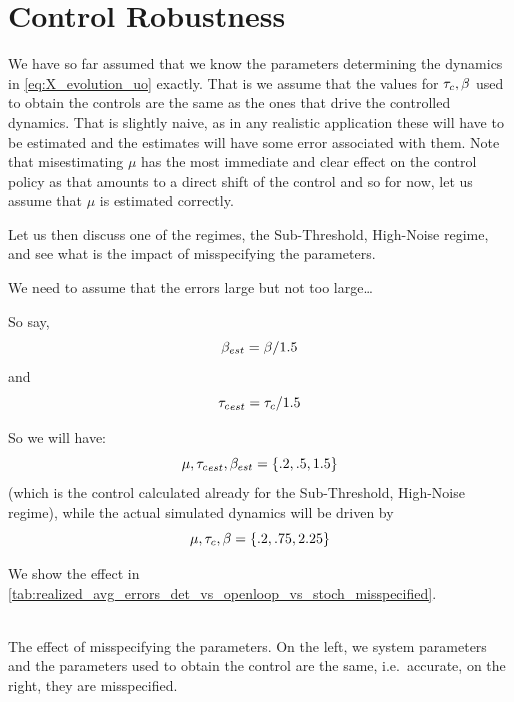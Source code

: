 \documentclass{article}
\begin{document}
\clearpage 

\section{Control Robustness}
We have so far assumed that we know the parameters determining the dynamics in
\cref{eq:X_evolution_uo} exactly. That is we assume that the values for ${ \tau_{c} },
{\beta}$ used to obtain the controls are the same as the ones that drive the
controlled dynamics. That is slightly naive, as in any realistic application
these will have to be estimated and the estimates will have some error
associated with them. 
Note that misestimating $\mu$ has the most immediate and clear effect on the
control policy as that amounts to a direct shift of the control and so for now,
let us assume that $\mu$ is estimated correctly.

Let us then discuss one of the regimes, the Sub-Threshold,
High-Noise regime, and see what is the impact of misspecifying the parameters.

We need to assume that the errors large but not too large\ldots

So say, $${\beta}_{est} = {\beta} / 1.5$$
and 
$${ \tau_{c} }_{est} = { \tau_{c} } / 1.5$$

So we will have:
$$\mu, { \tau_{c} }_{est}, {\beta}_{est} = \{.2, .5, 1.5 \}$$ (which is the control
calculated already for the Sub-Threshold,
High-Noise regime), while the actual simulated dynamics will be driven by
$$\mu, { \tau_{c} }, {\beta} = \{.2, .75, 2.25 \}$$

We show the effect in
\cref{tab:realized_avg_errors_det_vs_openloop_vs_stoch_misspecified}.
\begin{table}[h]
\begin{center}
 \\
 \caption{The effect of misspecifying the parameters. On the left, we
 system parameters and the parameters used to obtain the control are the
 same, i.e.\ accurate, on the right, they are misspecified.}
\label{tab:realized_avg_errors_det_vs_openloop_vs_stoch_misspecified}
\end{center}   
\end{table}
\end{document}
